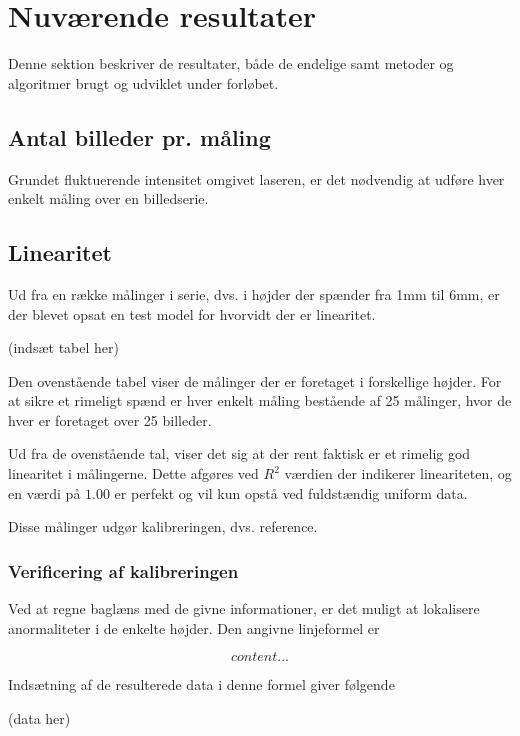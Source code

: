 \section{Nuværende resultater}

Denne sektion beskriver de resultater, både de endelige samt metoder og algoritmer brugt og udviklet under forløbet.

\subsection{Antal billeder pr. måling}

Grundet fluktuerende intensitet omgivet laseren, er det nødvendig at udføre hver enkelt måling over en billedserie.

\subsection{Linearitet}

Ud fra en række målinger i serie, dvs. i højder der spænder fra 1mm til 6mm, er der blevet opsat en test model for hvorvidt der er linearitet.


(indsæt tabel her)


Den ovenstående tabel viser de målinger der er foretaget i forskellige højder. For at sikre et rimeligt spænd er hver enkelt måling bestående af 25 målinger, hvor de hver er foretaget over 25 billeder.

Ud fra de ovenstående tal, viser det sig at der rent faktisk er et rimelig god linearitet i målingerne.
Dette afgøres ved $R^2$ værdien der indikerer lineariteten, og en værdi på $1.00$ er perfekt og vil kun opstå ved fuldstændig uniform data.

Disse målinger udgør kalibreringen, dvs. reference.

\subsubsection{Verificering af kalibreringen}

Ved at regne baglæns med de givne informationer, er det muligt at lokalisere anormaliteter i de enkelte højder.
Den angivne linjeformel er

\begin{equation}
content...
\end{equation}

Indsætning af de resulterede data i denne formel giver følgende

(data her)


